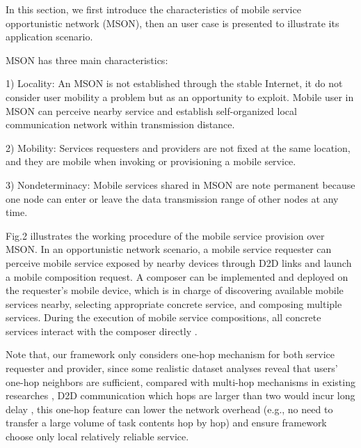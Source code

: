 \documentclass[10pt,journal,compsoc]{IEEEtran}
\begin{document}
In this section, we first introduce the characteristics of mobile service opportunistic network (MSON), then an user case is presented to illustrate its application scenario.

MSON has three main characteristics:

1) Locality: An MSON is not established through the stable Internet, it do not consider user mobility a problem but as an opportunity to exploit. Mobile user in MSON can perceive nearby service and establish self-organized local communication network within transmission distance.

2) Mobility: Services requesters and providers are not fixed at the same location, and they are mobile when invoking or provisioning a mobile service.

3) Nondeterminacy: Mobile services shared in MSON are note permanent because one node can enter or leave the data transmission range of other nodes at any time. 

Fig.2 illustrates the working procedure of the mobile service provision over MSON. In an opportunistic network scenario, a mobile service requester can perceive mobile service exposed by nearby devices through D2D links and launch a mobile composition request. A composer can be implemented and deployed on the requester's mobile device, which is in charge of discovering available mobile services nearby, selecting appropriate concrete service, and composing multiple services. During the execution of mobile service compositions, all concrete services interact with the composer directly \cite{Deng2017}.

Note that, our framework only considers one-hop mechanism for both service requester and provider, since some realistic dataset analyses reveal that users' one-hop neighbors are sufficient, compared with multi-hop mechanisms in existing researches \cite{chang2015progressive,tuncay2013participant,wu2013homing,jiang2016exploiting,liu2013exploring}, D2D communication which hops are larger than two would incur long delay \cite{li2014can},  this one-hop feature can lower the network overhead (e.g., no need to transfer a large volume of task contents hop by hop) and ensure framework choose only local relatively reliable service. 
\end{document}
